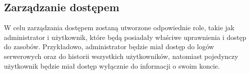 \documentclass[12pt,titlepage]{article}
\begin{document}
\subsection{Zarządzanie dostępem}
W celu zarządzania dostępem zostaną utworzone odpowiednie role, takie jak administrator i użytkownik, które będą posiadały właściwe uprawnienia i dostęp do zasobów. Przykładowo, administrator będzie miał dostęp do logów serwerowych oraz do historii wszystkich użytkowników, natomiast pojedynczy użytkownik będzie miał dostęp wyłącznie do informacji o swoim koncie.
\end{document}
